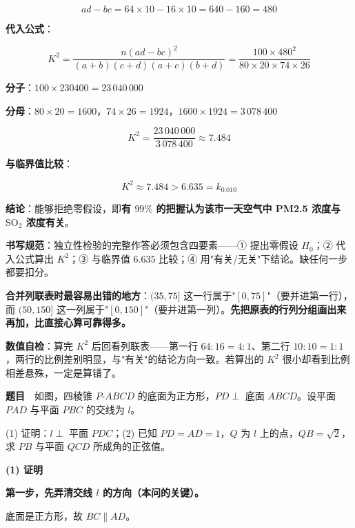 \[ad-bc=64\times10-16\times10=640-160=480\]

\textbf{代入公式}：

\[K^{2}=\frac{n(ad-bc)^{2}}{(a+b)(c+d)(a+c)(b+d)}=\frac{100\times480^{2}}{80\times20\times74\times26}\]

\textbf{分子}：$100\times230400=23\,040\,000$

\textbf{分母}：$80\times20=1600$，$74\times26=1924$，$1600\times1924=3\,078\,400$

\[K^{2}=\frac{23\,040\,000}{3\,078\,400}\approx7.484\]

\textbf{与临界值比较}：

\[K^{2}\approx7.484>6.635=k_{0.010}\]

\textbf{结论}：能够拒绝零假设，即\textbf{有 $99\%$ 的把握认为该市一天空气中 PM2.5 浓度与 $\mathrm{SO_2}$ 浓度有关}。

\begin{gktip}
\textbf{书写规范}：独立性检验的完整作答必须包含四要素——① 提出零假设 $H_0$；② 代入公式算出 $K^{2}$；③ 与临界值 $6.635$ 比较；④ 用"有关/无关"下结论。缺任何一步都要扣分。

\textbf{合并列联表时最容易出错的地方}：$(35,75]$ 这一行属于"$[0,75]$"（要并进第一行），而 $(50,150]$ 这一列属于"$[0,150]$"（要并进第一列）。\textbf{先把原表的行列分组画出来再加，比直接心算可靠得多。}

\textbf{数值自检}：算完 $K^{2}$ 后回看列联表——第一行 $64:16=4:1$、第二行 $10:10=1:1$，两行的比例差别明显，与"有关"的结论方向一致。若算出的 $K^{2}$ 很小却看到比例相差悬殊，一定是算错了。
\end{gktip}

\par\medskip


\textbf{题目}　如图，四棱锥 $P\text{-}ABCD$ 的底面为正方形，$PD\perp$ 底面 $ABCD$。设平面 $PAD$ 与平面 $PBC$ 的交线为 $l$。

\begin{center}\end{center}

  (1) 证明：$l\perp$ 平面 $PDC$；(2) 已知 $PD=AD=1$，$Q$ 为 $l$ 上的点，$QB=\sqrt2$，求 $PB$ 与平面 $QCD$ 所成角的正弦值。

\par\medskip

\textbf{(1) 证明}

\textbf{第一步，先弄清交线 $l$ 的方向（本问的关键）。}

底面是正方形，故 $BC\parallel AD$。

